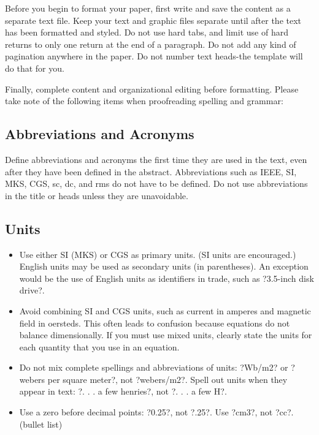 \documentclass[letterpaper, 10 pt, conference]{ieeeconf}  %
\begin{document}
Before you begin to format your paper, first write and save the content as a separate text file. Keep your text and graphic files separate until after the text has been formatted and styled. Do not use hard tabs, and limit use of hard returns to only one return at the end of a paragraph. Do not add any kind of pagination anywhere in the paper. Do not number text heads-the template will do that for you.

Finally, complete content and organizational editing before formatting. Please take note of the following items when proofreading spelling and grammar:

\subsection{Abbreviations and Acronyms} Define abbreviations and acronyms the first time they are used in the text, even after they have been defined in the abstract. Abbreviations such as IEEE, SI, MKS, CGS, sc, dc, and rms do not have to be defined. Do not use abbreviations in the title or heads unless they are unavoidable.

\subsection{Units}

\begin{itemize}

\item Use either SI (MKS) or CGS as primary units. (SI units are encouraged.) English units may be used as secondary units (in parentheses). An exception would be the use of English units as identifiers in trade, such as ?3.5-inch disk drive?.
\item Avoid combining SI and CGS units, such as current in amperes and magnetic field in oersteds. This often leads to confusion because equations do not balance dimensionally. If you must use mixed units, clearly state the units for each quantity that you use in an equation.
\item Do not mix complete spellings and abbreviations of units: ?Wb/m2? or ?webers per square meter?, not ?webers/m2?.  Spell out units when they appear in text: ?. . . a few henries?, not ?. . . a few H?.
\item Use a zero before decimal points: ?0.25?, not ?.25?. Use ?cm3?, not ?cc?. (bullet list)

\end{itemize}
\end{document}
